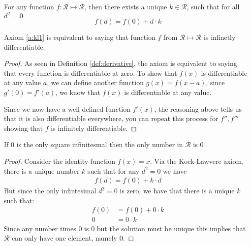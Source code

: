 \begin{axiom}\label{a:kl1}
  For any function $f: \mathcal{R}\mapsto \mathcal{R}$, then there exists a unique $k \in \mathcal{R}$, such that for all $d^2=0$
  \begin{equation*}
    f(d)=f(0)+d\cdot k
  \end{equation*}
\end{axiom}
\begin{corollary}
  Axiom \ref{a:kl1} is equivalent to saying that function $f$ from $\mathcal{R}\mapsto \mathcal{R}$ is infinetly differentiable.
\end{corollary}
\begin{proof}
  As seen in Definition \ref{def:derivative}, the axiom is equivalent to saying that every function is differentiable at zero. To show that $f(x)$ is differentiable at any value $a$, we can define another function $g(x)=f(x-a)$, since $g'(0)=f'(a)$, we know that $f(x)$ is differentiable at any value. 
  
  Since we now have a well defined function $f'(x)$, the reasoning above tells us that it is also differentiable everywhere, you can repeat this process for $f'',f'''$ showing that $f$ is infinitely differentiable.
\end{proof}
\begin{lemma}
  If $0$ is the only square infinitesmal then the only number in $\mathcal{R}$ is $0$
\end{lemma}
\begin{proof}
  Consider the identity function $f(x)=x$. Via the Kock-Lawvere axiom, there is a unique number $k$ such that for any $d^2=0$ we have
  \begin{align*}
    f(d)=f(0)+k\cdot d
  \end{align*} 
  But since the only infintesimal $d^2=0$ is zero, we have that there is a unique $k$ such that:
  \begin{align*}
    f(0)&=f(0)+0\cdot k\\
    0&=0\cdot k
  \end{align*}
  Since any number times $0$ is $0$ but the solution must be unique this implies that $\mathcal{R}$ can only have one element, namely $0$.
\end{proof}


